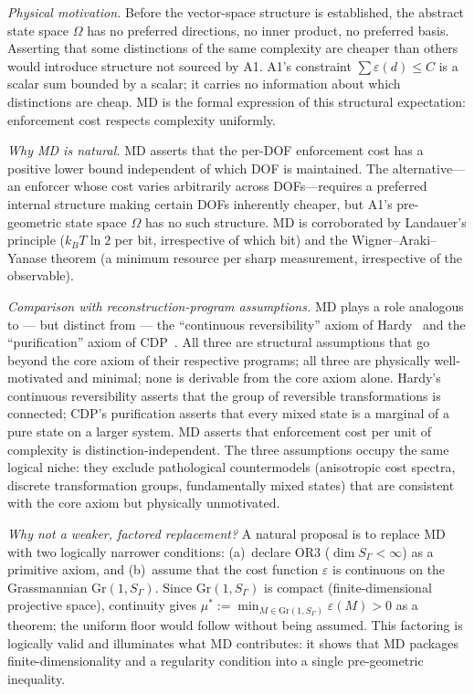 \documentclass[11pt]{article}
\theoremstyle{remark}
\begin{document}
\smallskip\noindent\textit{Physical motivation.}  Before the vector-space structure is established, the abstract state space $\Omega$ has no preferred directions, no inner product, no preferred basis.  Asserting that some distinctions of the same complexity are cheaper than others would introduce structure not sourced by A1.  A1's constraint $\sum \varepsilon(d) \le C$ is a scalar sum bounded by a scalar; it carries no information about which distinctions are cheap.  MD is the formal expression of this structural expectation: enforcement cost respects complexity uniformly.

\smallskip\noindent\textit{Why MD is natural.}  MD asserts that the per-DOF enforcement cost has a positive lower bound independent of which DOF is maintained.  The alternative---an enforcer whose cost varies arbitrarily across DOFs---requires a preferred internal structure making certain DOFs inherently cheaper, but A1's pre-geometric state space $\Omega$ has no such structure.  MD is corroborated by Landauer's principle ($k_BT \ln 2$ per bit, irrespective of which bit) and the Wigner--Araki--Yanase theorem (a minimum resource per sharp measurement, irrespective of the observable).

\smallskip\noindent\textit{Comparison with reconstruction-program assumptions.}  MD plays a role analogous to --- but distinct from --- the ``continuous reversibility'' axiom of Hardy~\cite{Hardy2001} and the ``purification'' axiom of CDP~\cite{CDP2011}.  All three are structural assumptions that go beyond the core axiom of their respective programs; all three are physically well-motivated and minimal; none is derivable from the core axiom alone.  Hardy's continuous reversibility asserts that the group of reversible transformations is connected; CDP's purification asserts that every mixed state is a marginal of a pure state on a larger system.  MD asserts that enforcement cost per unit of complexity is distinction-independent.  The three assumptions occupy the same logical niche: they exclude pathological countermodels (anisotropic cost spectra, discrete transformation groups, fundamentally mixed states) that are consistent with the core axiom but physically unmotivated.

\smallskip\noindent\textit{Why not a weaker, factored replacement?}  A natural proposal is to replace MD with two logically narrower conditions: (a)~declare OR3 ($\dim S_\Gamma < \infty$) as a primitive axiom, and (b)~assume that the cost function $\varepsilon$ is continuous on the Grassmannian $\mathrm{Gr}(1, S_\Gamma)$.  Since $\mathrm{Gr}(1, S_\Gamma)$ is compact (finite-dimensional projective space), continuity gives $\mu^* := \min_{M \in \mathrm{Gr}(1,S_\Gamma)} \varepsilon(M) > 0$ as a theorem; the uniform floor would follow without being assumed.  This factoring is logically valid and illuminates what MD contributes: it shows that MD packages finite-dimensionality and a regularity condition into a single pre-geometric inequality.
\end{document}
